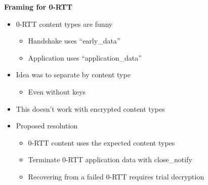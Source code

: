 \documentclass[helvetica]{seminar}
\newcommand{\heading}[1]{%
  \begin{center} 
    \large\bf 
    #1 
  \end{center} 
  \vspace{.4 in}}
\begin{document}
\begin{slide}
\heading{Framing for 0-RTT}

\begin{itemize}
\item 0-RTT content types are funny
  \begin{itemize}
  \item Handshake uses ``early\_data''
  \item Application uses ``application\_data''
  \end{itemize}
\item Idea was to separate by content type
  \begin{itemize}
  \item Even without keys
  \end{itemize}

\item This doesn't work with encrypted content types
\item Proposed resolution
  \begin{itemize}
  \item 0-RTT content uses the expected content types
  \item Terminate 0-RTT application data with close\_notify
  \item Recovering from a failed 0-RTT requires trial decryption
  \end{itemize}
\end{itemize}
\end{slide}
\end{document}
